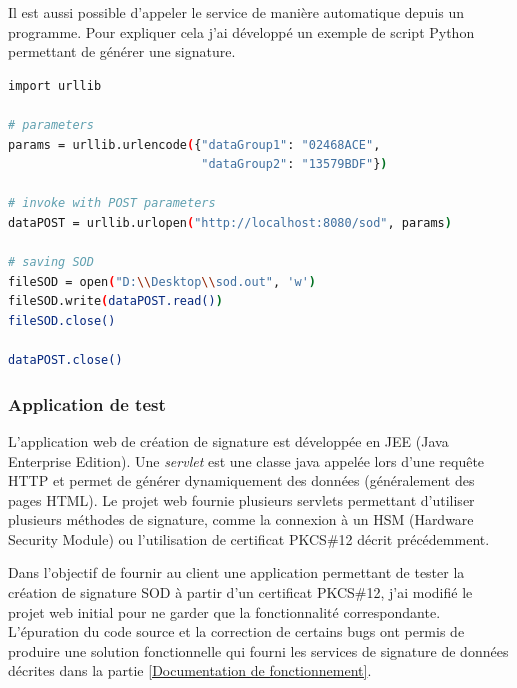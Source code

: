 Il est aussi possible d'appeler le service de manière automatique depuis un programme.
Pour expliquer cela j'ai développé un exemple de script Python permettant de générer une signature.
\begin{lstlisting}[language = sh]
import urllib

# parameters
params = urllib.urlencode({"dataGroup1": "02468ACE",
                           "dataGroup2": "13579BDF"})

# invoke with POST parameters
dataPOST = urllib.urlopen("http://localhost:8080/sod", params)

# saving SOD
fileSOD = open("D:\\Desktop\\sod.out", 'w')
fileSOD.write(dataPOST.read())
fileSOD.close()

dataPOST.close()
\end{lstlisting}


\subsubsection{Application de test}

L'application web de création de signature est développée en JEE (Java Enterprise Edition).
Une \textit{servlet} est une classe java appelée lors d'une requête HTTP et permet de générer dynamiquement des données (généralement des pages HTML).
Le projet web fournie plusieurs servlets permettant d'utiliser plusieurs méthodes de signature, comme la connexion à un HSM (Hardware Security Module) ou l'utilisation de certificat PKCS\#12 décrit précédemment.

Dans l'objectif de fournir au client une application permettant de tester la création de signature SOD à partir d'un certificat PKCS\#12, j'ai modifié le projet web initial pour ne garder que la fonctionnalité correspondante.
L'épuration du code source et la correction de certains bugs ont permis de produire une solution fonctionnelle qui fourni les services de signature de données décrites dans la partie \ref{Documentation de fonctionnement}.
